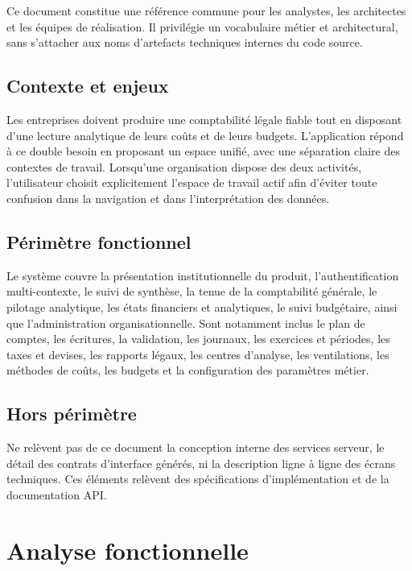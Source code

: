 \documentclass[12pt,a4paper]{report}
\begin{document}
Ce document constitue une référence commune pour les analystes, les architectes et les équipes de réalisation. Il privilégie un vocabulaire métier et architectural, sans s'attacher aux noms d'artefacts techniques internes du code source.

\section{Contexte et enjeux}

Les entreprises doivent produire une comptabilité légale fiable tout en disposant d'une lecture analytique de leurs coûts et de leurs budgets. L'application répond à ce double besoin en proposant un espace unifié, avec une séparation claire des contextes de travail. Lorsqu'une organisation dispose des deux activités, l'utilisateur choisit explicitement l'espace de travail actif afin d'éviter toute confusion dans la navigation et dans l'interprétation des données.

\section{Périmètre fonctionnel}

Le système couvre la présentation institutionnelle du produit, l'authentification multi-contexte, le suivi de synthèse, la tenue de la comptabilité générale, le pilotage analytique, les états financiers et analytiques, le suivi budgétaire, ainsi que l'administration organisationnelle. Sont notamment inclus le plan de comptes, les écritures, la validation, les journaux, les exercices et périodes, les taxes et devises, les rapports légaux, les centres d'analyse, les ventilations, les méthodes de coûts, les budgets et la configuration des paramètres métier.

\section{Hors périmètre}

Ne relèvent pas de ce document la conception interne des services serveur, le détail des contrats d'interface générés, ni la description ligne à ligne des écrans techniques. Ces éléments relèvent des spécifications d'implémentation et de la documentation API.

\chapter{Analyse fonctionnelle}
\end{document}
